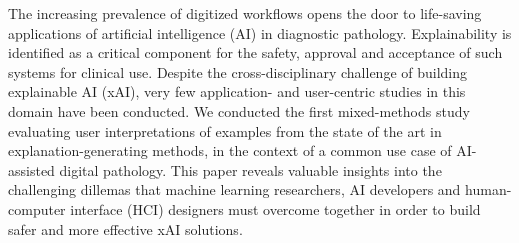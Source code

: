 The increasing prevalence of digitized workflows opens the door to life-saving applications of artificial intelligence (AI) in diagnostic pathology. Explainability is identified as a critical component for the safety, approval and acceptance of such systems for clinical use. Despite the cross-disciplinary challenge of building explainable AI (xAI), very few application- and user-centric studies in this domain have been conducted. We conducted the first mixed-methods study evaluating user interpretations of examples from the state of the art in explanation-generating methods, in the context of a common use case of AI-assisted digital pathology. This paper reveals valuable insights into the challenging dillemas that machine learning researchers, AI developers and human-computer interface (HCI) designers must overcome together in order to build safer and more effective xAI solutions.